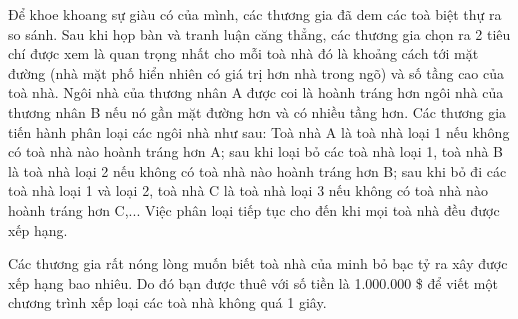 Để khoe khoang sự giàu có của mình, các thương gia đã dem các toà biệt thự ra so sánh. Sau khi họp bàn và tranh luận căng thẳng, các thương gia chọn ra 2 tiêu chí được xem là quan trọng nhất cho mỗi toà nhà đó là khoảng cách tới mặt đường (nhà mặt phố hiển nhiên có giá trị hơn nhà trong ngõ) và số tầng cao của toà nhà. Ngôi nhà của thương nhân A được coi là hoành tráng hơn ngôi nhà của thương nhân B nếu nó gần mặt đường hơn và có nhiều tầng hơn. Các thương gia tiến hành phân loại các ngôi nhà như sau: Toà nhà A là toà nhà loại 1 nếu không có toà nhà nào hoành tráng hơn A; sau khi loại bỏ các toà nhà loại 1, toà nhà B là toà nhà loại 2 nếu không có toà nhà nào hoành tráng hơn B; sau khi bỏ đi các toà nhà loại 1 và loại 2, toà nhà C là toà nhà loại 3 nếu không có toà nhà nào hoành tráng hơn C,... Việc phân loại tiếp tục cho đến khi mọi toà nhà đều được xếp hạng.

Các thương gia rất nóng lòng muốn biết toà nhà của minh bỏ bạc tỷ ra xây được xếp hạng bao nhiêu. Do đó bạn được thuê với số tiền là 1.000.000 \$ để viết một chương trình xếp loại các toà nhà không quá 1 giây.

\